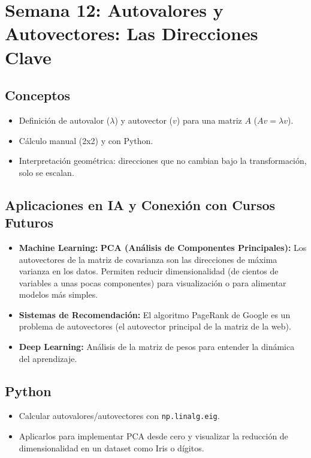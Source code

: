 \documentclass[12pt,a4paper,openany,oneside]{book}
\begin{document}
\section{Semana 12: Autovalores y Autovectores: Las Direcciones Clave}

\subsection{Conceptos}
\begin{itemize}
    \item Definición de autovalor (\(\lambda\)) y autovector (\(v\)) para una matriz \(A\) (\(Av = \lambda v\)).
    \item Cálculo manual (2x2) y con Python.
    \item Interpretación geométrica: direcciones que no cambian bajo la transformación, solo se escalan.
\end{itemize}

\subsection{Aplicaciones en IA y Conexión con Cursos Futuros}
\begin{itemize}
    \item \textbf{Machine Learning:} \textbf{PCA (Análisis de Componentes Principales):} Los autovectores de la matriz de covarianza son las direcciones de máxima varianza en los datos. Permiten reducir dimensionalidad (de cientos de variables a unas pocas componentes) para visualización o para alimentar modelos más simples.
    \item \textbf{Sistemas de Recomendación:} El algoritmo PageRank de Google es un problema de autovectores (el autovector principal de la matriz de la web).
    \item \textbf{Deep Learning:} Análisis de la matriz de pesos para entender la dinámica del aprendizaje.
\end{itemize}

\subsection{Python}
\begin{itemize}
    \item Calcular autovalores/autovectores con \texttt{np.linalg.eig}.
    \item Aplicarlos para implementar PCA desde cero y visualizar la reducción de dimensionalidad en un dataset como Iris o dígitos.
\end{itemize}
\end{document}
